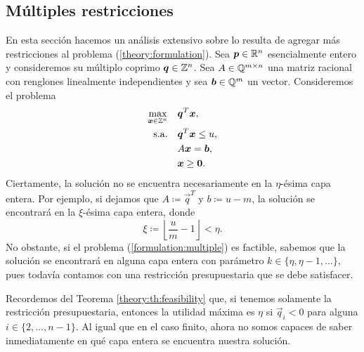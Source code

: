 \subsection{Múltiples restricciones}
\noindent
En esta sección hacemos un análisis extensivo sobre lo resulta de agregar más restricciones al
problema (\ref{theory:formulation}). Sea $\boldsymbol{p} \in \mathbb{R}^n$ esencialmente entero y consideremos su
múltiplo coprimo $\boldsymbol{q} \in \mathbb{Z}^n$. Sea $A \in \mathbb{Q}^{m \times n}$ una matriz racional con renglones
linealmente independientes y sea $\boldsymbol{b} \in \mathbb{Q}^m$ un vector. Consideremos el problema
\begin{subequations}
	\label{formulation:multiple}
	\begin{align}
		\max_{\boldsymbol{x} \in \mathbb{Z}^n} \quad
			& \boldsymbol{q}^T\boldsymbol{x}, \label{formulation:multiple:objective} \\
		\text{s.a.} \quad
			& \boldsymbol{q}^T\boldsymbol{x} \leq u, \label{formulation:multiple:constraint:budget} \\
			& A\boldsymbol{x} = \boldsymbol{b}, \label{formulation:multiple:constraints} \\
			& \boldsymbol{x} \geq \boldsymbol{0}. \nonumber
	\end{align}
\end{subequations}
Ciertamente, la solución no se encuentra necesariamente en la $\eta$-ésima capa entera. Por ejemplo,
si dejamos que $A \coloneq \vec{q}^T$ y $b \coloneq u - m$, la solución se encontrará en la
$\xi$-ésima capa entera, donde
\begin{equation*}
	\xi \coloneq \left\lfloor \frac{u}{m} - 1 \right\rfloor < \eta.
\end{equation*}
No obstante, si el problema (\ref{formulation:multiple}) es factible, sabemos que la solución se
encontrará en alguna capa entera con parámetro $k \in \lbrace \eta, \eta - 1, \ldots \rbrace$, pues
todavía contamos con una restricción presupuestaria que se debe satisfacer.
\begin{observation}
	Recordemos del Teorema \ref{theory:th:feasibility} que, si tenemos solamente la restricción
	presupuestaria, entonces la utilidad máxima es $\eta$ si $\vec{q}_i < 0$ para alguna $i \in
	\lbrace 2, \ldots, n - 1\rbrace$. Al igual que en el caso finito, ahora no somos capaces de
	saber inmediatamente en qué capa entera se encuentra nuestra solución.
\end{observation}

